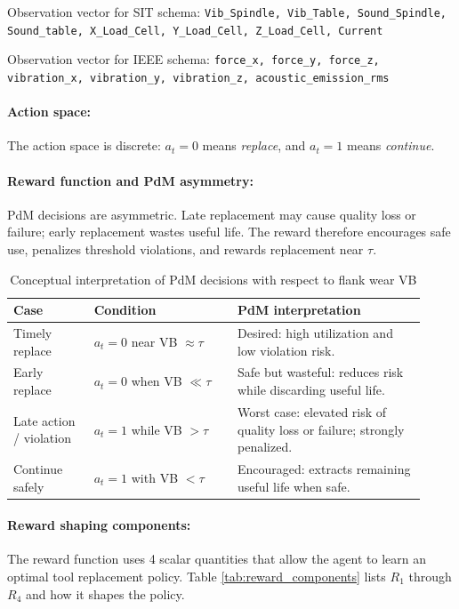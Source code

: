 \documentclass[sn-basic]{sn-jnl}%
\begin{document}
Observation vector for SIT schema: \texttt{Vib\_Spindle, Vib\_Table, Sound\_Spindle, Sound\_table, X\_Load\_Cell, Y\_Load\_Cell, Z\_Load\_Cell, Current}

Observation vector for IEEE schema: \texttt{force\_x, force\_y, force\_z, vibration\_x, vibration\_y, vibration\_z, acoustic\_emission\_rms}

\paragraph{Action space:}
The action space is discrete: $a_t=0$ means \emph{replace}, and $a_t=1$ means \emph{continue}.

\paragraph{Reward function and PdM asymmetry:}
PdM decisions are asymmetric. Late replacement may cause quality loss or failure; early replacement wastes useful life. The reward therefore encourages safe use, penalizes threshold violations, and rewards replacement near $\tau$.

\begin{table}[htbp]
	\centering
	\caption{Conceptual interpretation of PdM decisions with respect to flank wear \textsc{VB}}
	\label{tab:cost_view}
	\begin{tabular}{L{0.18\linewidth} L{0.32\linewidth} L{0.42\linewidth}}
		\toprule
		\textbf{Case} & \textbf{Condition} & \textbf{PdM interpretation}\\
		\midrule
		Timely replace & $a_t=0$ near \textsc{VB} $\approx\tau$ & Desired: high utilization and low violation risk.\\
		Early replace & $a_t=0$ when \textsc{VB} $\ll\tau$ & Safe but wasteful: reduces risk while discarding useful life.\\
		Late action / violation & $a_t=1$ while \textsc{VB} $>\tau$ & Worst case: elevated risk of quality loss or failure; strongly penalized.\\
		Continue safely & $a_t=1$ with \textsc{VB} $<\tau$ & Encouraged: extracts remaining useful life when safe.\\
		\bottomrule
	\end{tabular}
\end{table}

\paragraph{Reward shaping components:} The reward function uses 4 scalar quantities that allow the agent to learn an optimal tool replacement policy. Table \ref{tab:reward_components} lists $R_1$ through $R_4$ and how it shapes the policy.
\end{document}
